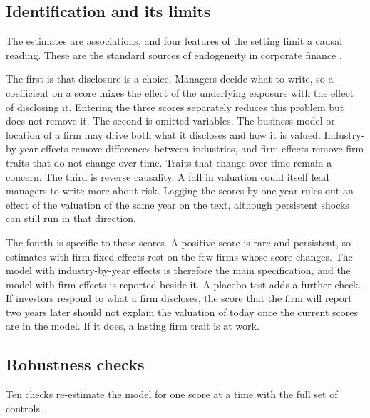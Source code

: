 \documentclass[12pt,a4paper]{article}
\begin{document}
\subsection{Identification and its limits}

The estimates are associations, and four features of the setting limit a causal reading. These are the standard sources of endogeneity in corporate finance \citep{roberts2013}.

The first is that disclosure is a choice. Managers decide what to write, so a coefficient on a score mixes the effect of the underlying exposure with the effect of disclosing it. Entering the three scores separately reduces this problem but does not remove it. The second is omitted variables. The business model or location of a firm may drive both what it discloses and how it is valued. Industry-by-year effects remove differences between industries, and firm effects remove firm traits that do not change over time. Traits that change over time remain a concern. The third is reverse causality. A fall in valuation could itself lead managers to write more about risk. Lagging the scores by one year rules out an effect of the valuation of the same year on the text, although persistent shocks can still run in that direction.

The fourth is specific to these scores. A positive score is rare and persistent, so estimates with firm fixed effects rest on the few firms whose score changes. The model with industry-by-year effects is therefore the main specification, and the model with firm effects is reported beside it. A placebo test adds a further check. If investors respond to what a firm discloses, the score that the firm will report two years later should not explain the valuation of today once the current scores are in the model. If it does, a lasting firm trait is at work.

\subsection{Robustness checks}

Ten checks re-estimate the model for one score at a time with the full set of controls.
\end{document}
